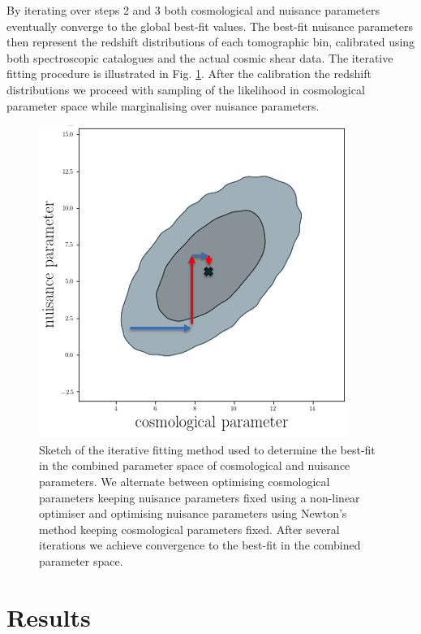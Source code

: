 \documentclass{aa}
\begin{document}
By iterating over steps 2 and 3 both cosmological and nuisance parameters eventually converge to the global best-fit values. The best-fit nuisance parameters then represent the redshift distributions of each tomographic bin, calibrated using both spectroscopic catalogues and the actual cosmic shear data. The iterative fitting procedure is illustrated in Fig. \ref{fig:iterative_calibration}. After the calibration the redshift distributions we proceed with sampling of the likelihood in cosmological parameter space while marginalising over nuisance parameters.
\begin{figure}
\centering
\includegraphics[scale=0.4]{plots/iterative.png}
\caption{Sketch of the iterative fitting method used to determine the best-fit in the combined parameter space of cosmological and nuisance parameters. We alternate between optimising cosmological parameters keeping nuisance parameters fixed using a non-linear optimiser and optimising nuisance parameters using Newton's method keeping cosmological parameters fixed. After several iterations we achieve convergence to the best-fit in the combined parameter space.}
\label{fig:iterative_calibration}
\end{figure}
\section{Results}
\label{sec:results}
\end{document}
